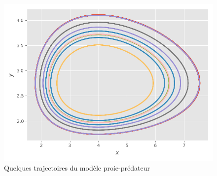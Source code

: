 \documentclass{wsdcr}
\begin{document}
\begin{figure}
    \centering
    \includegraphics[width=\linewidth]{fig/lv2_t.png}
    \caption{Quelques trajectoires du modèle proie-prédateur}
    \label{fig:ouverture}
\end{figure}
\end{document}

